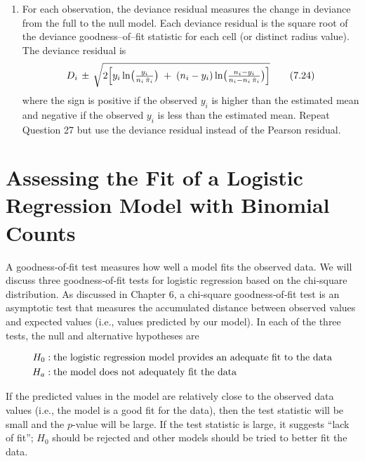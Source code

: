 \documentclass[
]{report}
\providecommand{\tightlist}{%
  \setlength{\itemsep}{0pt}\setlength{\parskip}{0pt}}
\begin{document}
\begin{enumerate}
\def\labelenumi{\arabic{enumi}.}
\setcounter{enumi}{27}
\tightlist
\item
  For each observation, the deviance residual measures the change in deviance from the full to the null model. Each deviance residual is the square root of the deviance goodness--of--fit statistic for each cell (or distinct radius value). The deviance residual is
  \begin{align}
  D_i \,\pm\, \sqrt{2 \Bigl[
  y_i \ln\bigl(\tfrac{y_i}{n_i\,\hat\pi_i}\bigr)
  \;+\;(n_i - y_i)\ln\bigl(\tfrac{n_i - y_i}{n_i - n_i\,\hat\pi_i}\bigr)
  \Bigr]}
  \tag{7.24}
  \end{align}
  where the sign is positive if the observed \(y_i\) is higher than the estimated mean and negative if the
  observed \(y_i\) is less than the estimated mean. Repeat Question 27 but use the deviance residual instead
  of the Pearson residual.
\end{enumerate}

\hypertarget{assessing-the-fit-of-a-logistic-regression-model-with-binomial-counts-1}{%
\section{\texorpdfstring{\textbf{Assessing the Fit of a Logistic Regression Model with Binomial Counts}}{Assessing the Fit of a Logistic Regression Model with Binomial Counts}}\label{assessing-the-fit-of-a-logistic-regression-model-with-binomial-counts-1}}

A goodness‐of‐fit test measures how well a model fits the observed data. We will discuss three goodness‐of‐fit tests for logistic regression based on the chi‐square distribution. As discussed in Chapter 6, a chi‐square goodness‐of‐fit test is an asymptotic test that measures the accumulated distance between observed values and expected values (i.e., values predicted by our model). In each of the three tests, the null and alternative hypotheses are

\begin{align}
H_0:\;&\text{the logistic regression model provides an adequate fit to the data} \notag \\
H_a:\;&\text{the model does not adequately fit the data} \notag
\end{align}

If the predicted values in the model are relatively close to the observed data values (i.e., the model is a good fit for the data), then the test statistic will be small and the \(p\)-value will be large. If the test statistic is large, it suggests ``lack of fit''; \(H_0\) should be rejected and other models should be tried to better fit the data.
\end{document}
